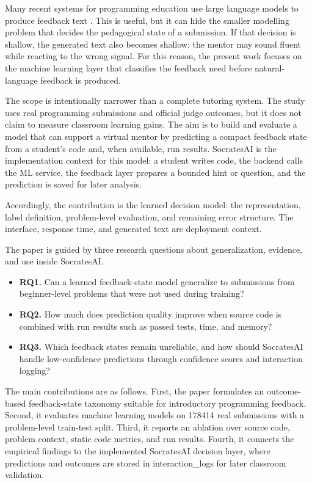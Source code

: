 \documentclass[twoside,11pt]{article}
\begin{document}
Many recent systems for programming education use large language models to produce feedback text \cite{Denny2024,Ahamed2025,CodeAid2024,Iris2024}. This is useful, but it can hide the smaller modelling problem that decides the pedagogical state of a submission. If that decision is shallow, the generated text also becomes shallow: the mentor may sound fluent while reacting to the wrong signal. For this reason, the present work focuses on the machine learning layer that classifies the feedback need before natural-language feedback is produced.

The scope is intentionally narrower than a complete tutoring system. The study uses real programming submissions and official judge outcomes, but it does not claim to measure classroom learning gains. The aim is to build and evaluate a model that can support a virtual mentor by predicting a compact feedback state from a student's code and, when available, run results. SocratesAI is the implementation context for this model: a student writes code, the backend calls the ML service, the feedback layer prepares a bounded hint or question, and the prediction is saved for later analysis.

Accordingly, the contribution is the learned decision model: the representation, label definition, problem-level evaluation, and remaining error structure. The interface, response time, and generated text are deployment context.

The paper is guided by three research questions about generalization, evidence, and use inside SocratesAI.

\begin{itemize}
\item {\bf RQ1.} Can a learned feedback-state model generalize to submissions from beginner-level problems that were not used during training?
\item {\bf RQ2.} How much does prediction quality improve when source code is combined with run results such as passed tests, time, and memory?
\item {\bf RQ3.} Which feedback states remain unreliable, and how should SocratesAI handle low-confidence predictions through confidence scores and interaction logging?
\end{itemize}

The main contributions are as follows. First, the paper formulates an outcome-based feedback-state taxonomy suitable for introductory programming feedback. Second, it evaluates machine learning models on 178414 real submissions with a problem-level train-test split. Third, it reports an ablation over source code, problem context, static code metrics, and run results. Fourth, it connects the empirical findings to the implemented SocratesAI decision layer, where predictions and outcomes are stored in \hbox{interaction\_logs} for later classroom validation.
\end{document}
